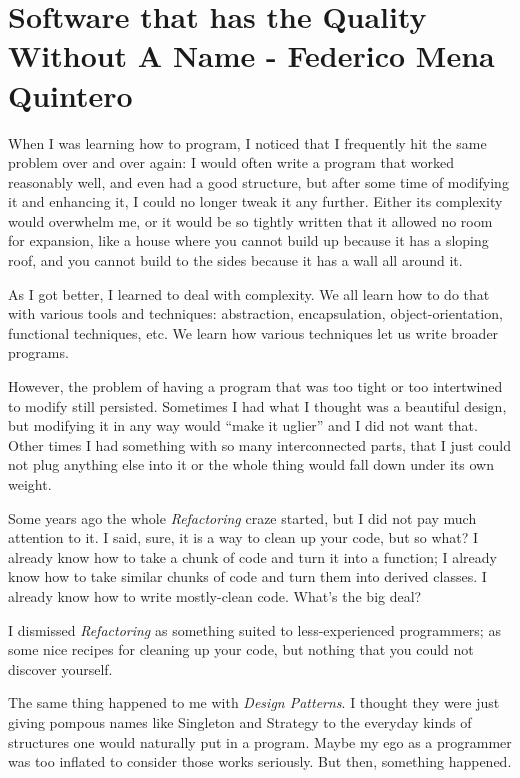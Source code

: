 \chapter{Software that has the Quality Without A Name - Federico Mena Quintero}
When I was learning how to program, I noticed that I frequently hit the same problem over and over again: I would often write a program that worked reasonably well, and even had a good structure, but after some time of modifying it and enhancing it, I could no longer tweak it any further. Either its complexity would overwhelm me, or it would be so tightly written that it allowed no room for expansion, like a house where you cannot build up because it has a sloping roof, and you cannot build to the sides because it has a wall all around it.

As I got better, I learned to deal with complexity. We all learn how to do that with various tools and techniques: abstraction, encapsulation, object-orientation, functional techniques, etc. We learn how various techniques let us write broader programs.

However, the problem of having a program that was too tight or too intertwined to modify still persisted.  Sometimes I had what I thought was a beautiful design, but modifying it in any way would ``make it uglier'' and I did not want that. Other times I had something with so many interconnected parts, that I just could not plug anything else into it or the whole thing would fall down under its own weight.

Some years ago the whole \textit{Refactoring} craze started, but I did not pay much attention to it. I said, sure, it is a way to clean up your code, but so what?  I already know how to take a chunk of code and turn it into a function; I already know how to take similar chunks of code and turn them into derived classes. I already know how to write mostly-clean code. What's the big deal?

I dismissed \textit{Refactoring} as something suited to less-experienced programmers; as some nice recipes for cleaning up your code, but nothing that you could not discover yourself.

The same thing happened to me with \textit{Design Patterns}. I thought they were just giving pompous names like Singleton and Strategy to the everyday kinds of structures one would naturally put in a program. Maybe my ego as a programmer was too inflated to consider those works seriously. But then, something happened.


